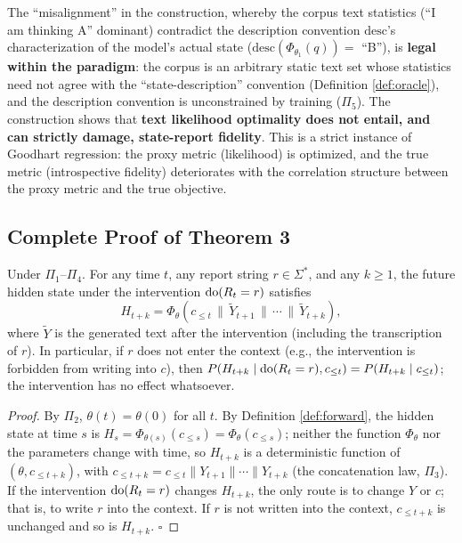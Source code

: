 \begin{remark}
The ``misalignment'' in the construction, whereby the corpus text statistics (``I am thinking A''
dominant) contradict the description convention $\mathrm{desc}$'s characterization of the
model's actual state ($\mathrm{desc}(\Phi_{\theta_1}(q)) = $ ``B''), is \textbf{legal within
the paradigm}: the corpus is an arbitrary static text set whose statistics need not agree
with the ``state-description'' convention (Definition \ref{def:oracle}), and the description
convention is unconstrained by training ($\Pi_5$). The construction shows that \textbf{text
likelihood optimality does not entail, and can strictly damage, state-report
fidelity}. This is a strict instance of Goodhart
regression\cite{manheim-garrabrant-2018-goodhart}: the proxy metric (likelihood) is optimized,
and the true metric (introspective fidelity) deteriorates with the correlation structure
between the proxy metric and the true objective.
\end{remark}

\subsection{Complete Proof of Theorem 3}

\begin{restate}
Under $\Pi_1$--$\Pi_4$. For any time $t$, any report string $r \in \Sigma^{*}$, and any
$k \ge 1$, the future hidden state under the intervention $\operatorname{do}(R_t = r)$ satisfies
\begin{equation}
H_{t+k} = \Phi_\theta\!\left( c_{\le t} \,\|\, \tilde{Y}_{t+1} \,\|\, \cdots \,\|\, \tilde{Y}_{t+k} \right),
\label{eq:a-thm3a}
\end{equation}
where $\tilde{Y}$ is the generated text after the intervention (including the transcription
of $r$). In particular, if $r$ does not enter the context (e.g., the intervention is
forbidden from writing into $c$), then
$P(H_{t+k} \mid \operatorname{do}(R_t = r), c_{\le t}) = P(H_{t+k} \mid c_{\le t})$;
the intervention has no effect whatsoever.
\end{restate}

\begin{proof}
By $\Pi_2$, $\theta(t) = \theta(0)$ for all $t$. By Definition \ref{def:forward}, the hidden
state at time $s$ is $H_s = \Phi_{\theta(s)}(c_{\le s}) = \Phi_\theta(c_{\le s})$; neither
the function $\Phi_\theta$ nor the parameters change with time, so $H_{t+k}$ is a
deterministic function of $(\theta, c_{\le t+k})$, with
$c_{\le t+k} = c_{\le t} \| Y_{t+1} \| \cdots \| Y_{t+k}$ (the concatenation law,
$\Pi_3$). If the intervention $\operatorname{do}(R_t = r)$ changes $H_{t+k}$, the only route is to change
$Y$ or $c$; that is, to write $r$ into the context. If $r$ is not written into the context,
$c_{\le t+k}$ is unchanged and so is $H_{t+k}$. $\square$
\end{proof}

